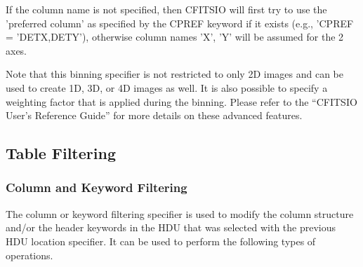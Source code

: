 \documentclass[11pt]{article}
\begin{document}
If the column name is not specified, then CFITSIO will first try to use
the 'preferred column' as specified by the CPREF keyword if it exists
(e.g., 'CPREF = 'DETX,DETY'), otherwise column names 'X', 'Y' will be
assumed for the 2 axes.

Note that this binning specifier is not restricted to only 2D images
and can be used to create 1D, 3D, or 4D images as well.  It is also
possible to specify a weighting factor that is applied during the
binning.  Please refer to the ``CFITSIO User's Reference Guide'' for
more details on these advanced features.
\newpage

\subsection{Table Filtering}

\subsubsection{Column and Keyword Filtering}

The column or keyword filtering specifier is used to modify the
column structure and/or the header keywords in the HDU that was
selected with the previous HDU location specifier.   It can
be used to perform the following types of operations.
\end{document}
